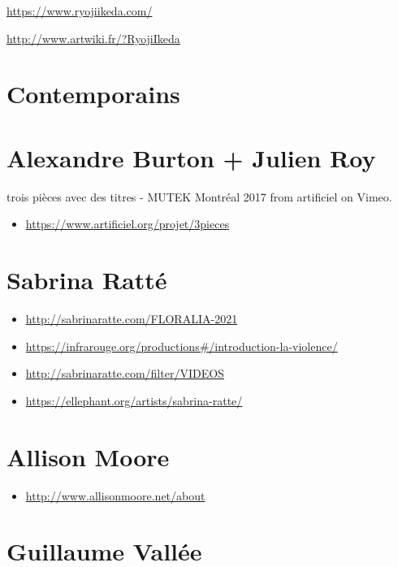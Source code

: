 \documentclass[
  french,
]{book}
\providecommand{\tightlist}{%
  \setlength{\itemsep}{0pt}\setlength{\parskip}{0pt}}
\begin{document}
\url{https://www.ryojiikeda.com/}

\url{http://www.artwiki.fr/?RyojiIkeda}

\hypertarget{contemporains}{%
\section{Contemporains}\label{contemporains}}

\hypertarget{alexandre-burton-julien-roy}{%
\section{Alexandre Burton + Julien Roy}\label{alexandre-burton-julien-roy}}

trois pièces avec des titres - MUTEK Montréal 2017 from artificiel on Vimeo.

\begin{itemize}
\tightlist
\item
  \url{https://www.artificiel.org/projet/3pieces}
\end{itemize}

\hypertarget{sabrina-rattuxe9}{%
\section{Sabrina Ratté}\label{sabrina-rattuxe9}}

\begin{itemize}
\tightlist
\item
  \url{http://sabrinaratte.com/FLORALIA-2021}
\item
  \url{https://infrarouge.org/productions\#/introduction-la-violence/}
\item
  \url{http://sabrinaratte.com/filter/VIDEOS}
\item
  \url{https://ellephant.org/artists/sabrina-ratte/}
\end{itemize}

\hypertarget{allison-moore}{%
\section{Allison Moore}\label{allison-moore}}

\begin{itemize}
\tightlist
\item
  \url{http://www.allisonmoore.net/about}
\end{itemize}

\hypertarget{guillaume-valluxe9e}{%
\section{Guillaume Vallée}\label{guillaume-valluxe9e}}
\end{document}
